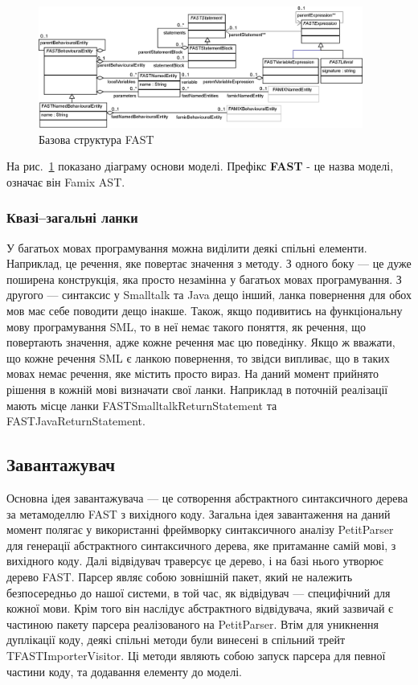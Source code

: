 \documentclass[12pt,a4paper]{article}
\begin{document}
\begin{figure}[h]
  \centering
    \includegraphics[width=0.95\textwidth]{GeneralASTClassDiagram}
  \caption{Базова структура FAST\label{genFast}}
\end{figure}

На рис.~\ref{genFast} показано діаграму основи моделі. Префікс \textbf{FAST} - це назва моделі, означає він Famix AST.

\subsubsection{Квазі--загальні ланки}

У багатьох мовах програмування можна виділити деякі спільні елементи. Наприклад, це речення, яке повертає значення з методу. З одного боку --- це дуже поширена конструкція, яка просто незамінна у багатьох мовах програмування. З другого --- синтаксис у Smalltalk та Java дещо інший, ланка повернення для обох мов має себе поводити дещо інакше. Також, якщо подивитись на функціональну мову програмування SML, то в неї немає такого поняття, як речення, що повертають значення, адже кожне речення має цю поведінку. Якщо ж вважати, що кожне речення SML є ланкою повернення, то звідси випливає, що в таких мовах немає речення, яке містить просто вираз. На даний момент прийнято рішення в кожній мові визначати свої ланки. Наприклад в поточній реалізації мають місце ланки FASTSmalltalkReturnStatement та FASTJavaReturnStatement.

\subsection{Завантажувач}

Основна ідея завантажувача --- це сотворення абстрактного синтаксичного дерева за метамоделлю FAST з вихідного коду. Загальна ідея завантаження на даний момент полягає у використанні фреймворку синтаксичного аналізу PetitParser для генерації абстрактного синтаксичного дерева, яке притаманне самій мові, з вихідного коду. Далі відвідувач траверсує це дерево, і на базі нього утворює дерево FAST. Парсер являє собою зовнішній пакет, який не належить безпосередньо до нашої системи, в той час, як відвідувач --- специфічний для кожної мови. Крім того він наслідує абстрактного відвідувача, який зазвичай є частиною пакету парсера реалізованого на PetitParser. Втім для уникнення дуплікації коду, деякі спільні методи були винесені в спільний трейт TFASTImporterVisitor. Ці методи являють собою запуск парсера для певної частини коду, та додавання елементу до моделі.
\end{document}
